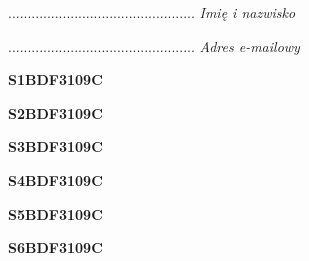 \begin{turn}{90}\begin{minipage}{\linewidth} \vspace{20mm} ................................................  \textit{Imię i nazwisko}\end{minipage}\end{turn}

\begin{turn}{90}\begin{minipage}{\linewidth} \vspace{20mm} ................................................  \textit{Adres e-mailowy}\end{minipage}\end{turn}

\begin{turn}{90}\huge \begin{minipage}{\linewidth} \vspace{10mm}\textbf{S1BDF3109C}\end{minipage}\end{turn}

\begin{turn}{90}\huge \begin{minipage}{\linewidth} \vspace{10mm}\textbf{S2BDF3109C}\end{minipage}\end{turn}

\begin{turn}{90}\huge \begin{minipage}{\linewidth} \vspace{10mm}\textbf{S3BDF3109C}\end{minipage}\end{turn}

\begin{turn}{90}\huge \begin{minipage}{\linewidth} \vspace{10mm}\textbf{S4BDF3109C}\end{minipage}\end{turn}

\begin{turn}{90}\huge \begin{minipage}{\linewidth} \vspace{10mm}\textbf{S5BDF3109C}\end{minipage}\end{turn}

\begin{turn}{90}\huge \begin{minipage}{\linewidth} \vspace{10mm}\textbf{S6BDF3109C}\end{minipage}\end{turn}

